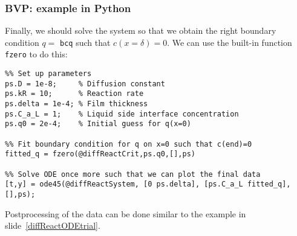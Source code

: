\begin{frame}[fragile]
  \frametitle{BVP: example in Python}
  Finally, we should solve the system so that we obtain the right boundary condition $q=$ \lstinline$bcq$ such that $c(x=\delta)=0$. We can use the built-in function \lstinline$fzero$ to do this:
  \begin{lstlisting}
%% Set up parameters
ps.D = 1e-8;     % Diffusion constant
ps.kR = 10;      % Reaction rate
ps.delta = 1e-4; % Film thickness
ps.C_a_L = 1;    % Liquid side interface concentration
ps.q0 = 2e-4;    % Initial guess for q(x=0)

%% Fit boundary condition for q on x=0 such that c(end)=0
fitted_q = fzero(@diffReactCrit,ps.q0,[],ps)

%% Solve ODE once more such that we can plot the final data
[t,y] = ode45(@diffReactSystem, [0 ps.delta], [ps.C_a_L fitted_q],[],ps);
  \end{lstlisting}
  Postprocessing of the data can be done similar to the example in slide~\ref{diffReactODEtrial}.
\end{frame}


